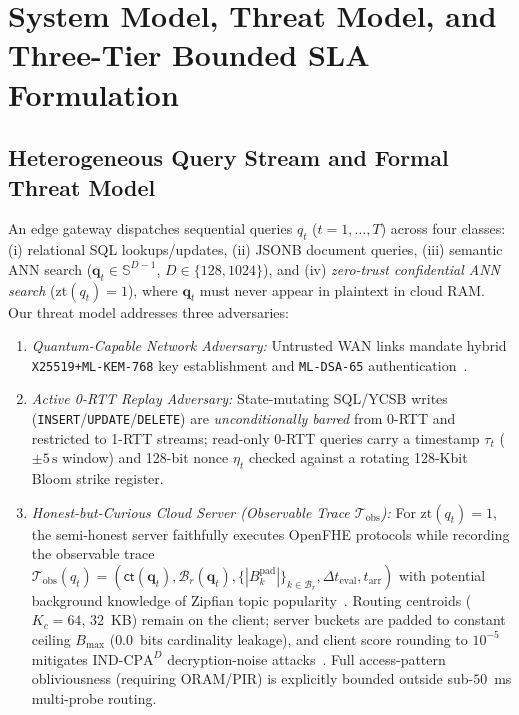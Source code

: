 \documentclass[10pt,journal,compsoc]{IEEEtran}
\begin{document}
\section{System Model, Threat Model, and Three-Tier Bounded SLA Formulation}\label{sec:model}
\subsection{Heterogeneous Query Stream and Formal Threat Model}
An edge gateway dispatches sequential queries $q_t$ ($t=1,\dots,T$) across four classes: (i) relational SQL lookups/updates, (ii) JSONB document queries, (iii) semantic ANN search ($\mathbf{q}_t \in \mathbb{S}^{D-1}$, $D \in \{128, 1024\}$), and (iv) \emph{zero-trust confidential ANN search} ($\mathrm{zt}(q_t)=1$), where $\mathbf{q}_t$ must never appear in plaintext in cloud RAM. Our threat model addresses three adversaries:
\begin{enumerate}
    \item \emph{Quantum-Capable Network Adversary:} Untrusted WAN links mandate hybrid \texttt{X25519+ML-KEM-768} key establishment and \texttt{ML-DSA-65} authentication~\cite{nist_fips203_2024,nist_fips204_2024}.
    \item \emph{Active 0-RTT Replay Adversary:} State-mutating SQL/YCSB writes (\texttt{INSERT}/\texttt{UPDATE}/\texttt{DELETE}) are \emph{unconditionally barred} from 0-RTT and restricted to 1-RTT streams; read-only 0-RTT queries carry a timestamp $\tau_t$ ($\pm 5\,\text{s}$ window) and 128-bit nonce $\eta_t$ checked against a rotating 128-Kbit Bloom strike register.
    \item \emph{Honest-but-Curious Cloud Server (Observable Trace $\mathcal{T}_{\mathrm{obs}}$):} For $\mathrm{zt}(q_t)=1$, the semi-honest server faithfully executes OpenFHE protocols while recording the observable trace $\mathcal{T}_{\mathrm{obs}}(q_t) = (\mathsf{ct}(\mathbf{q}_t), \mathcal{B}_r(\mathbf{q}_t), \{|B_k^{\mathrm{pad}}|\}_{k \in \mathcal{B}_r}, \Delta t_{\mathrm{eval}}, t_{\mathrm{arr}})$ with potential background knowledge of Zipfian topic popularity~\cite{islam2012accesspattern}. Routing centroids ($K_c=64$, $32$~KB) remain on the client; server buckets are padded to constant ceiling $B_{\max}$ ($0.0$~bits cardinality leakage), and client score rounding to $10^{-5}$ mitigates $\text{IND-CPA}^D$ decryption-noise attacks~\cite{li2021indcpad}. Full access-pattern obliviousness (requiring ORAM/PIR) is explicitly bounded outside sub-$50$~ms multi-probe routing.
\end{enumerate}
\end{document}
